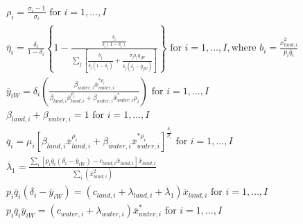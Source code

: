 \begin{equation}\label{eq:optimality_program}
    \begin{split}
        & \rho _ { i } = \frac { \sigma _ { i } - 1 } { \sigma _ { i } } \text { for } i = 1 , \ldots , I \\
        & \overline { \eta } _ { i } = \frac { \delta _ { i } } { 1 - \delta _ { i } } \left\{ 1 - \frac { \frac { b _ { i } } { \delta _ { i } \left( 1 - \delta _ { i } \right) } } { \sum _ { j } \left[ \frac { b _ { j } } { \delta _ { j } \left( 1 - \delta _ { j } \right) } + \frac { \sigma _ { j } b _ { j } \overline { y } _ { j W } } { \delta _ { j } \left( \delta _ { j } - \overline { y } _ { j W } \right) } \right] } \right\} \text { for } i = 1 , \ldots , I , \text {where } b _ { i } = \frac { \overline { x } _ { land,i } ^ { 2 } } { p _ { i } \overline { q } _ { i } } \\
        & \overline {y}_{iW} = \delta _ { i } \left( \frac { \beta _ { water,i } \overline { x } _ { water,i } ^ { * \rho _ { i } } } { \beta _ { land,i } \overline { x } _ { land,i } ^ { \rho _ { i } } + \beta _ { water,i } \overline { x } _ { water,i } ^ { * } \rho _ { i } } \right) \text { for } i = 1 , \ldots , I \\
        & \beta _ {land, i  } + \beta_{water,i} = 1 \text { for } i= 1 , \ldots , I \\
        & \overline { q } _ { i } = \mu _ { i } \left[ \beta _ { land,i } \overline { x } _ { land,i } ^ { \rho _ { i } } + \beta _ { water,i } \overline { x } _ { water,i } ^ { * \rho _ { i } } \right] ^ { \frac { \delta _ { i } } { \rho _ { i } } } \text { for } i = 1 , \ldots , I \\
        & \overline { \lambda } _ { 1 } = \frac { \sum _ { i } \left[ p _ { i } \overline { q } _ { i } \left( \delta _ { i } - \overline { y } _ { i W } \right) - c _ { land,i } \overline { x } _ { land,i } \right] \overline { x } _ { land,i } } { \sum _ { i } \left( \overline { x } _ { land,i } ^ { 2 } \right) } \\
        & p _ { i } \overline { q } _ { i } \left( \delta _ { i } - \overline { y } _ { i W } \right) = \left( c _ { land,i } + \lambda _ { land,i } + \overline { \lambda } _ { 1 } \right) \overline { x } _ { land,i } \text { for } i = 1 , \ldots , I \\
        & p _ { i } \overline { q } _ { i } \overline { y } _ { i W } = \left( c _ { water,i } + \lambda _ { water,i } \right) \overline { x } _ { water,i } ^ { * } \text { for } i = 1 , \ldots , I
    \end{split}
\end{equation}


